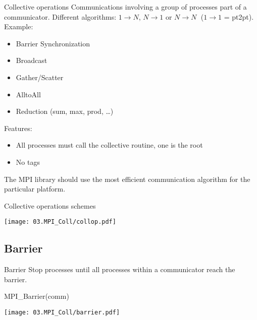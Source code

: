 \documentclass[aspectratio=43]{beamer}
\begin{document}
\begin{frame}{Collective operations}
Communications involving a group of processes part of a communicator.
Different algorithms: $1\rightarrow N$, $N\rightarrow 1$ or $N\rightarrow N\;$ ($1\rightarrow 1$ = pt2pt).\\

Example:
\begin{itemize}
\item Barrier Synchronization
\item Broadcast
\item Gather/Scatter
\item AlltoAll
\item Reduction (sum, max, prod, \ldots )
\end{itemize}

Features:
\begin{itemize}
    \item All processes must call the collective routine, one is the root
    \item No tags
\end{itemize}

The MPI library should use the most efficient communication algorithm for the particular platform.
\end{frame}

\begin{frame}{Collective operations schemes}
\begin{center}
    \texttt{[image: 03.MPI\_Coll/collop.pdf]}
\end{center}
\end{frame}

\subsection{Barrier}

\begin{frame}[fragile]{Barrier}
Stop processes until all processes within a communicator reach the barrier.\\
\begin{Pseudolisting}[]{}
MPI_Barrier(comm)
\end{Pseudolisting}
\begin{center}
\texttt{[image: 03.MPI\_Coll/barrier.pdf]}
\end{center}
\end{frame}
\end{document}
